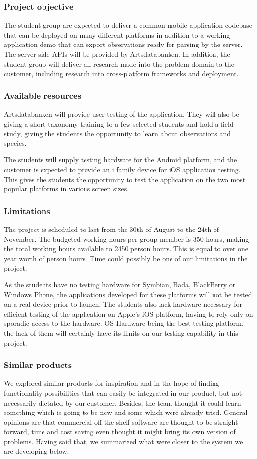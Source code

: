 \subsubsection{Project objective}
The student group are expected to deliver a common mobile application codebase
that can be deployed on many different platforms in addition to a working
application demo that can export observations ready for parsing by the server.
The server-side APIs will be provided by Artsdatabanken. In addition, the
student group will deliver all research made into the problem domain to the
customer, including research into cross-platform frameworks and deployment.

\subsubsection{Available resources}
Artsdatabanken will provide user testing of the application. They will also be giving a short taxonomy training to a few selected students and hold a field study, giving the
students the opportunity to learn about observations and species.

The students will supply testing hardware for the Android platform, and the customer is expected to provide an i family device for iOS application testing. This gives the students the opportunity to test
the application on the two most popular platforms in various screen sizes.

\subsubsection{Limitations}
The project is scheduled to last from the 30th of August to the 24th of
November. The budgeted working hours per group member is 350 hours, making the
total working hours available to 2450  person hours. This is equal to over one
year worth of person hours. Time could possibly be one of our limitations in the project.

As the students have no testing hardware for Symbian, Bada, BlackBerry or
Windows Phone, the applications developed for these platforms will not be
tested on a real device prior to launch. The students also lack hardware
necessary for efficient testing of the application on Apple's iOS platform, having to rely only on sporadic
access to the hardware. OS Hardware being the best testing platform, the lack of them will certainly have its limits on our testing capability in this project.

\subsubsection{Similar products}
We explored similar products for inspiration and in the hope of finding
functionality possibilities that can easily be integrated in our product, but
not necessarily dictated by our customer. Besides, the team thought it could
learn something which is going to be new and some which were already tried.
General opinions are that commercial-off-the-shelf software are thought to be
straight forward, time and cost saving even thought it might bring its own
version of problems\cite{similarproduct:introdn}. Having said that, we
summarized what were closer to the system we are developing below.
